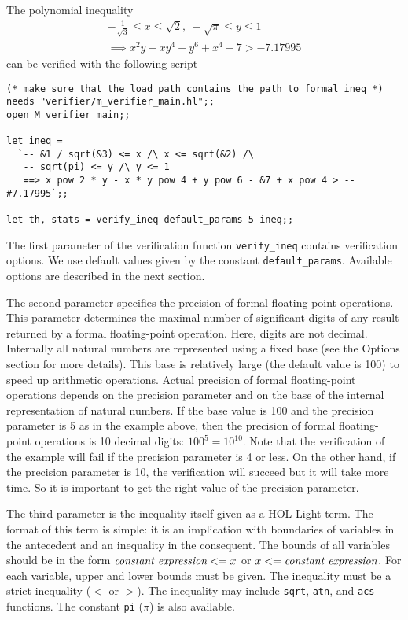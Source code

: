\documentclass[a4paper]{article}
\begin{document}
The polynomial inequality
\begin{multline*}
-\frac{1}{\sqrt{3}} \le x \le \sqrt{2},\ -\sqrt{\pi} \le y \le 1\\
\implies x^2 y - x y^4 + y^6 + x^4 - 7 > -7.17995
\end{multline*}
can be verified with the following script

\begin{verbatim}
(* make sure that the load_path contains the path to formal_ineq *)
needs "verifier/m_verifier_main.hl";;
open M_verifier_main;;

let ineq = 
  `-- &1 / sqrt(&3) <= x /\ x <= sqrt(&2) /\ 
   -- sqrt(pi) <= y /\ y <= 1
   ==> x pow 2 * y - x * y pow 4 + y pow 6 - &7 + x pow 4 > -- #7.17995`;;

let th, stats = verify_ineq default_params 5 ineq;;
\end{verbatim}

The first parameter of the verification function \verb|verify_ineq| contains verification options. We use default values given by the constant \verb|default_params|. Available options are described in the next section.

The second parameter specifies the precision of formal floating-point operations. This parameter determines the maximal number of significant digits of any result returned by a formal floating-point operation. Here, digits are not decimal. Internally all natural numbers are represented using a fixed base (see the Options section for more details). This base is relatively large (the default value is 100) to speed up arithmetic operations. Actual precision of formal floating-point operations depends on the precision parameter and on the base of the internal representation of natural numbers. If the base value is 100 and the precision parameter is 5 as in the example above, then the precision of formal floating-point operations is 10 decimal digits: $100^5 = 10^10$. Note that the verification of the example will fail if the precision parameter is 4 or less. On the other hand, if the precision parameter is 10, the verification will succeed but it will take more time. So it is important to get the right value of the precision parameter.

The third parameter is the inequality itself given as a HOL Light term. The format of this term is simple: it is an implication with boundaries of variables in the antecedent and an inequality in the consequent. The bounds of all variables should be in the form $\text{\it constant expression} <= x$ or $x <= \text{\it constant expression}$. For each variable, upper and lower bounds must be given. The inequality must be a strict inequality ($<$ or $>$). The inequality may include \verb|sqrt|, \verb|atn|, and \verb|acs| functions. The constant \verb|pi| ($\pi$) is also available.
\end{document}
